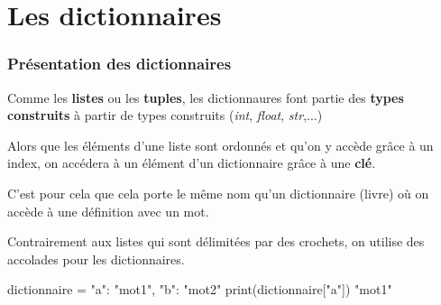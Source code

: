 

\section{Les dictionnaires} 

\begin{frame}[fragile]
\frametitle{Présentation des dictionnaires}

Comme les \textbf{listes} ou les \textbf{tuples}, les dictionnaures font partie des \textbf{types construits} à partir de types construits (\textit{int}, \textit{float}, \textit{str},...)

Alors que les éléments d’une liste sont ordonnés et qu'on y accède grâce à un index, on accédera à un élément d'un dictionnaire grâce à une \textbf{clé}.

C'est pour cela que cela porte le même nom qu'un dictionnaire (livre) où on accède à une définition avec un mot.

Contrairement aux listes qui sont délimitées par des crochets, on utilise des accolades pour les dictionnaires.

\begin{GrayBox}[0.85\textwidth]
\begin{verbatimtab}[3]
dictionnaire = {"a": "mot1", "b": "mot2"}
print(dictionnaire["a"])
	"mot1"
\end{verbatimtab}
\end{GrayBox}

\end{frame}

